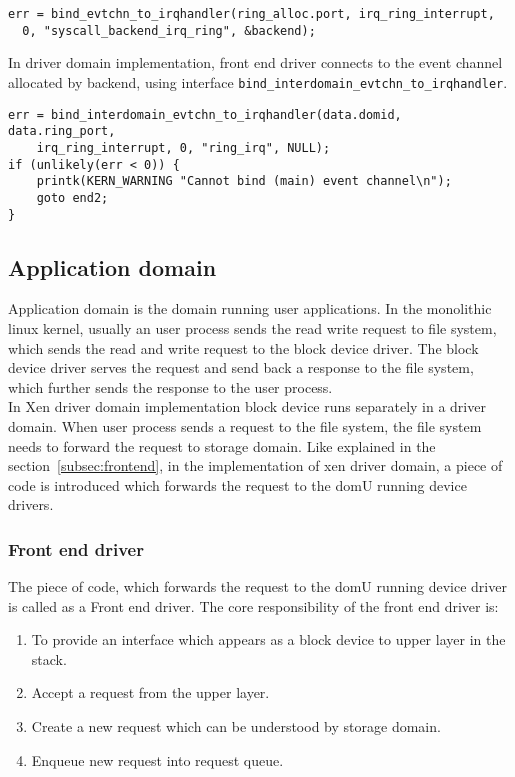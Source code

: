 \begin{verbatim}
err = bind_evtchn_to_irqhandler(ring_alloc.port, irq_ring_interrupt,
  0, "syscall_backend_irq_ring", &backend);
\end{verbatim}
In driver domain implementation, front end driver connects to the event channel allocated by backend, using interface \texttt{bind\_interdomain\_evtchn\_to\_irqhandler}.  
\begin{verbatim}
err = bind_interdomain_evtchn_to_irqhandler(data.domid, data.ring_port,
    irq_ring_interrupt, 0, "ring_irq", NULL);
if (unlikely(err < 0)) {
	printk(KERN_WARNING "Cannot bind (main) event channel\n");
	goto end2;
}
\end{verbatim}

\subsection{Application domain}
Application domain is the domain running user applications. In the monolithic linux kernel, usually an user process sends the read write request to file system, which sends the read and write request to the block device driver. The block device driver serves the request and send back a response to the file system, which further sends the response to the user process. 
\\ 
In Xen driver domain implementation block device runs separately in a driver domain. When user process sends a request to the file system, the file system needs to forward the request to storage domain. Like explained in the section~\ref{subsec:frontend}, in the implementation of xen driver domain, a piece of code is introduced which forwards the request to the domU running device drivers. 

\subsubsection*{Front end driver}

The piece of code, which forwards the request to the domU running device driver is called as a Front end driver. The core responsibility of the front end driver is:
\begin{enumerate}
\item To provide an interface which appears as a block device to upper layer in the stack.
\item Accept a request from the upper layer.
\item Create a new request which can be understood by storage domain.
\item Enqueue new request into request queue.
\end{enumerate}

